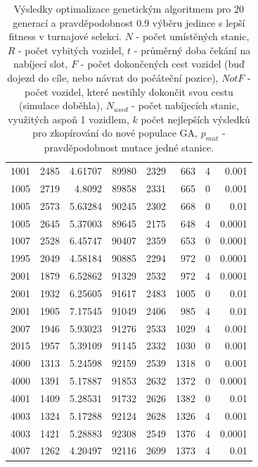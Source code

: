 \begin{table}
\begin{tabular}{lrrrrrrr}
1001 & 2485 & 4.61707 & 89980 & 2329 & 663 & 4 & 0.001 \\
1005 & 2719 & 4.8092 & 89858 & 2331 & 665 & 0 & 0.001 \\
1005 & 2573 & 5.63284 & 90245 & 2302 & 668 & 0 & 0.01 \\
1005 & 2645 & 5.37003 & 89645 & 2175 & 648 & 4 & 0.0001 \\
1007 & 2528 & 6.45747 & 90407 & 2359 & 653 & 0 & 0.0001 \\
1995 & 2049 & 4.58184 & 90885 & 2294 & 972 & 0 & 0.0001 \\
2001 & 1879 & 6.52862 & 91329 & 2532 & 972 & 4 & 0.0001 \\
2001 & 1932 & 6.25605 & 91617 & 2483 & 1005 & 0 & 0.01 \\
2001 & 1905 & 7.17545 & 91049 & 2406 & 985 & 4 & 0.01 \\
2007 & 1946 & 5.93023 & 91276 & 2533 & 1029 & 4 & 0.001 \\
2015 & 1957 & 5.39109 & 91145 & 2332 & 1030 & 0 & 0.001 \\
4000 & 1313 & 5.24598 & 92159 & 2539 & 1318 & 0 & 0.001 \\
4000 & 1391 & 5.17887 & 91853 & 2632 & 1372 & 0 & 0.0001 \\
4001 & 1409 & 5.28531 & 91732 & 2626 & 1382 & 0 & 0.01 \\
4003 & 1324 & 5.17288 & 92124 & 2628 & 1326 & 4 & 0.001 \\
4003 & 1421 & 5.28883 & 92308 & 2549 & 1376 & 4 & 0.0001 \\
4007 & 1262 & 4.20497 & 92116 & 2699 & 1373 & 4 & 0.01 \\
\bottomrule
\end{tabular}
\caption{Výsledky optimalizace genetickým algoritmem pro 20 generací a pravděpodobnost 
0.9 výběru jedince s lepší fitness v turnajové selekci.
$N$ - počet umístěných stanic, $R$ - počet vybitých vozidel, $t$ - průměrný doba čekání na nabíjecí slot, $F$ - počet dokončených
cest vozidel (buď dojezd do cíle, nebo návrat do počáteční pozice), $Not F$ - počet vozidel, které nestihly
dokončit svou cestu (simulace doběhla), $N_{used}$ - počet nabíjecích stanic, využitých aspoň 1 vozidlem, 
$k$ počet nejlepších výsledků pro zkopírování do nové populace GA, $p_{mut}$ - pravděpodobnost mutace jedné stanice.}
\label{tab:vysledky_genetic}
\end{table}


